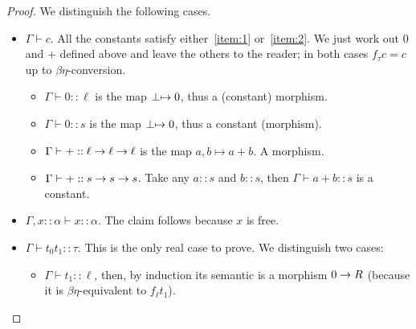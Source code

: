 \begin{proof}
  We distinguish the following cases.
  \begin{itemize}
  \item $\Gamma\vdash c$. All the constants satisfy
    either~\ref{item:1} or~\ref{item:2}. We just work out $0$ and $+$
    defined above and leave the others to the reader; in both cases
    $f_\tau c=c$ up to $\beta\eta$-conversion.
    \begin{itemize}
    \item $\Gamma\vdash0::\ell$ is the map $\perp\mapsto 0$, thus a
      (constant) morphism.
    \item $\Gamma\vdash0::s$ is the map $\perp\mapsto 0$, thus a constant
      (morphism).
    \item $\Gamma\vdash+::\ell\rightarrow\ell\rightarrow\ell$ is the map $a,b\mapsto
      a+b$. A morphism.
    \item $\Gamma\vdash+::s\rightarrow s\rightarrow s$. Take any $a::s$ and $b::s$, then
      $\Gamma\vdash a+b::s$ is a constant.
    \end{itemize}
  \item $\Gamma,x::\alpha\vdash x::\alpha$. The claim follows because
    $x$ is free.
  \item $\Gamma\vdash t_0t_1::\tau$. This is the only real case
    to prove. We distinguish two cases:
    \begin{itemize}
    \item $\Gamma\vdash t_1::\ell$, then, by induction its semantic is
      a morphism $0\rightarrow R$ (because it is $\beta\eta$-equivalent to
      $f_\ell t_1$). 


\end{itemize}
\end{itemize}
\end{proof}
